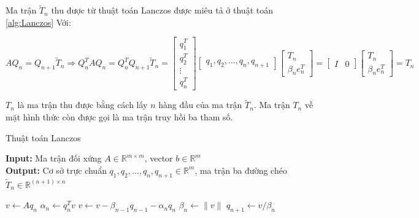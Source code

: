 \documentclass[14pt, a4paper]{article}
\numberwithin{equation}{section}
\numberwithin{algorithm}{section}
\numberwithin{figure}{section}
\numberwithin{dl}{section}
\numberwithin{md}{section}
\numberwithin{bd}{section}
\numberwithin{dn}{section}
\begin{document}
Ma trận $\widetilde{T}_n$ thu được từ thuật toán Lanczos được miêu tả ở thuật toán \ref{alg:Lanczos}
Với:

\begin{equation} \label{eq:Three-term-recurrence}
    AQ_n = Q_{n+1}\widetilde{T}_n \Rightarrow Q_n^TAQ_n = Q_n^TQ_{n+1}\widetilde{T}_n=\begin{bmatrix}
        q_1^T \\ q_2^T \\ \vdots \\ q_n^T
    \end{bmatrix} \begin{bmatrix} q_1, q_2, \dots, q_n, q_{n+1} \end{bmatrix}\begin{bmatrix}
        T_n \\ \beta_n e_n^T
    \end{bmatrix}=\begin{bmatrix}
        I & 0
    \end{bmatrix} \begin{bmatrix}
        T_n \\ \beta_n e_n^T
    \end{bmatrix}=T_n
\end{equation}

$T_n$ là ma trận thu được bằng cách lấy $n$ hàng đầu của ma trận $\widetilde{T}_n$. 
Ma trận $T_n$ về mặt hình thức còn được gọi là ma trận truy hồi ba tham số.

\begin{algorithm}[h!]
    \caption{Thuật toán Lanczos}\label{alg:Lanczos}
    \hspace*{\algorithmicindent} \textbf{Input:} {Ma trận đối xứng $A \in \mathbb{R}^{m \times m}$, vector $b \in \mathbb{R}^m$} \\
    \hspace*{\algorithmicindent} \textbf{Output:} {Cơ sở trực chuẩn $q_1, q_2, \dots, q_n, q_{n+1} \in \mathbb{R}^m$, ma trận ba đường chéo $\widetilde{T}_n \in \mathbb{R}^{(n+1) \times n}$}
    \begin{algorithmic}
            \State $v \leftarrow Aq_n$
            \State $\alpha_n \leftarrow q_n^Tv$
            \State $v \leftarrow v - \beta_{n-1}q_{n-1} - \alpha_n q_n$
            \State $\beta_n \leftarrow \lVert v \rVert$
            \State $q_{n+1} \leftarrow v/\beta_n$
        \EndFor
    \end{algorithmic}
\end{algorithm}
\end{document}
